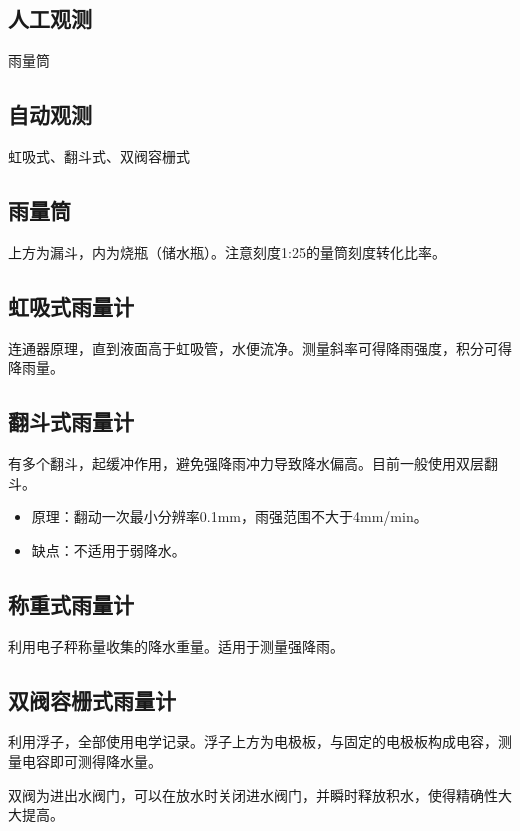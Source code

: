 \documentclass[UTF8,11pt]{ctexbook}
\begin{document}
\subsection{人工观测}

雨量筒

\subsection{自动观测}

虹吸式、翻斗式、双阀容栅式

\subsection{雨量筒}

上方为漏斗，内为烧瓶（储水瓶）。注意刻度1:25的量筒刻度转化比率。

\subsection{虹吸式雨量计}

连通器原理，直到液面高于虹吸管，水便流净。测量斜率可得降雨强度，积分可得降雨量。

\subsection{翻斗式雨量计}

有多个翻斗，起缓冲作用，避免强降雨冲力导致降水偏高。目前一般使用双层翻斗。
\begin{itemize}
    \item 原理：翻动一次最小分辨率0.1mm，雨强范围不大于4mm/min。
    \item 缺点：不适用于弱降水。
\end{itemize}

\subsection{称重式雨量计}

利用电子秤称量收集的降水重量。适用于测量强降雨。

\subsection{双阀容栅式雨量计}

利用浮子，全部使用电学记录。浮子上方为电极板，与固定的电极板构成电容，测量电容即可测得降水量。

双阀为进出水阀门，可以在放水时关闭进水阀门，并瞬时释放积水，使得精确性大大提高。
\end{document}

